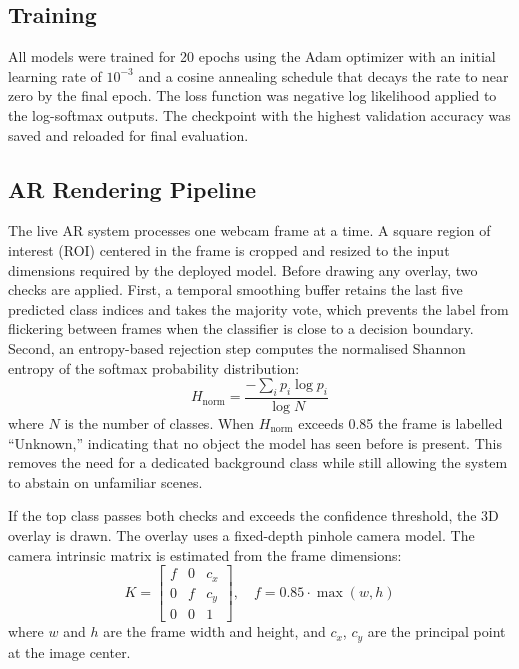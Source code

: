 \documentclass[conference]{IEEEtran}
\begin{document}
\subsection{Training}

All models were trained for 20 epochs using the Adam optimizer with an initial
learning rate of $10^{-3}$ and a cosine annealing schedule that decays the
rate to near zero by the final epoch. The loss function was negative log
likelihood applied to the log-softmax outputs. The checkpoint with the highest
validation accuracy was saved and reloaded for final evaluation.

\subsection{AR Rendering Pipeline}

The live AR system processes one webcam frame at a time. A square region of
interest (ROI) centered in the frame is cropped and resized to the input
dimensions required by the deployed model. Before drawing any overlay, two
checks are applied. First, a temporal smoothing buffer retains the last five
predicted class indices and takes the majority vote, which prevents the label
from flickering between frames when the classifier is close to a decision
boundary. Second, an entropy-based rejection step computes the normalised
Shannon entropy of the softmax probability distribution:
\begin{equation}
H_\text{norm} = \frac{-\sum_i p_i \log p_i}{\log N}
\end{equation}
where $N$ is the number of classes. When $H_\text{norm}$ exceeds 0.85 the
frame is labelled ``Unknown,'' indicating that no object the model has seen
before is present. This removes the need for a dedicated background class
while still allowing the system to abstain on unfamiliar scenes.

If the top class passes both checks and exceeds the confidence threshold, the
3D overlay is drawn. The overlay uses a fixed-depth pinhole camera model. The
camera intrinsic matrix is estimated from the frame dimensions:
\begin{equation}
K = \begin{bmatrix} f & 0 & c_x \\ 0 & f & c_y \\ 0 & 0 & 1 \end{bmatrix},
\quad f = 0.85 \cdot \max(w, h)
\end{equation}
where $w$ and $h$ are the frame width and height, and $c_x$, $c_y$ are the
principal point at the image center.
\end{document}
